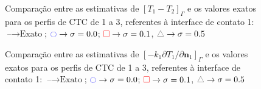 \begin{figure}[h!b]
	\caption{Comparação entre as estimativas de $[T_1 - T_2]_\Gamma$ e os valores exatos para os perfis de CTC de 1 a 3, referentes à interface de contato 1: $\text{--} \rightarrow \text{Exato}$; $\textcolor{blue}{\ocircle} \rightarrow \sigma = 0.0$; $\textcolor{red}{\square} \rightarrow \sigma = 0.1$, $\textcolor{gray}{\triangle} \rightarrow \sigma = 0.5$}
\end{figure}

\begin{figure}[h!b]
	\caption{Comparação entre as estimativas de $[-k_1 {\partial T_1}/{\partial\mathbf{n}_1}]_\Gamma$ e os valores exatos para os perfis de CTC de 1 a 3, referentes à interface de contato 1: $\text{--} \rightarrow \text{Exato}$; $\textcolor{blue}{\ocircle} \rightarrow \sigma = 0.0$; $\textcolor{red}{\square} \rightarrow \sigma = 0.1$, $\textcolor{gray}{\triangle} \rightarrow \sigma = 0.5$}
\end{figure}


